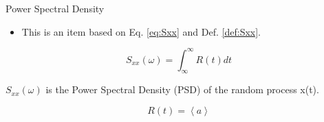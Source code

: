 \documentclass{beamer}
\begin{document}
\begin{frame}{Power Spectral Density}

\begin{itemize}
\item This is an item based on Eq. \ref{eq:Sxx} and Def. \ref{def:Sxx}.
\end{itemize}
\begin{equation}
S_{xx}(\omega)=\int_{\infty}^{\infty}R(t)dt
\label{eq:Sxx}
\end{equation}

\begin{Definition}
$S_{xx}(\omega)$ is the Power Spectral Density (PSD) of the random process x(t).
\label{def:Sxx}
\end{Definition}

\label{fr:1}
\end{frame}


\begin{frame}{}

\begin{equation}
R(t)=\left<a\right>
\end{equation}

\end{frame}
\end{document}
